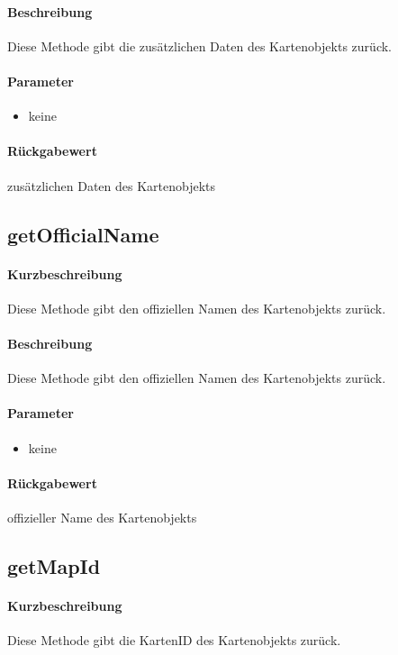 \paragraph*{Beschreibung}
Diese Methode gibt die zusätzlichen Daten des Kartenobjekts zurück.
\paragraph*{Parameter}
\begin{itemize}
    \item keine
\end{itemize}
\paragraph*{Rückgabewert}
zusätzlichen Daten des Kartenobjekts

\subsection{getOfficialName}
\paragraph*{Kurzbeschreibung}
Diese Methode gibt den offiziellen Namen des Kartenobjekts zurück.
\paragraph*{Beschreibung}
Diese Methode gibt den offiziellen Namen des Kartenobjekts zurück.
\paragraph*{Parameter}
\begin{itemize}
    \item keine
\end{itemize}
\paragraph*{Rückgabewert}
offizieller Name des Kartenobjekts

\subsection{getMapId}
\paragraph*{Kurzbeschreibung}
Diese Methode gibt die KartenID des Kartenobjekts zurück.
